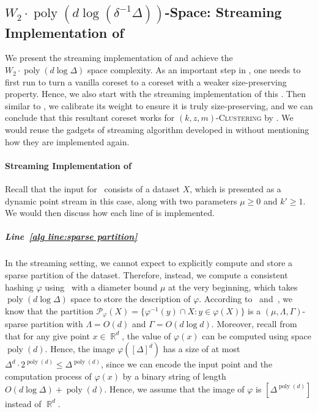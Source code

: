 \documentclass[letterpaper,11pt]{article}
\theoremstyle{plain}
\theoremstyle{definition}
\theoremstyle{remark}
\DeclareMathOperator{\R}{\mathbb{R}}
\DeclareMathOperator{\poly}{poly}
\renewcommand{\phi}{\varphi}
\newcommand{\calP}{\mathcal{P}}
\newcommand{\ProblemName}[1]{\textsc{#1}}
\newcommand{\kzmC}{\ProblemName{$(k,z,m)$-Clustering}\xspace}
\begin{document}
%
      \subsection{$W_2\cdot\poly(d\log(\delta^{-1}\Delta))$-Space: Streaming Implementation of~}
\label{sec:streaming alg}
We present the streaming implementation of  and achieve the $W_2\cdot \poly(d\log\Delta)$ space complexity.
As an important step in , one needs to first run  to turn a vanilla coreset to a coreset with a weaker size-preserving property.
Hence, we also start with the streaming implementation of this .
Then similar to , we calibrate its weight to ensure it is truly size-preserving,
and we can conclude that this resultant coreset works for \kzmC by .
We would reuse the gadgets of streaming algorithm developed in  without mentioning how they are implemented again.




\paragraph{Streaming Implementation of~}
Recall that the input for~ consists of a dataset $X$, which is presented as a dynamic point stream in this case, along with two parameters $\mu\geq 0$ and $k'\geq 1$. 
We would then discuss how each line of  is implemented.

\subparagraph{Line~\ref{alg line:sparse partition}} 

In the streaming setting, we cannot expect to explicitly compute and store a sparse partition of the dataset. Therefore, instead, we compute a consistent hashing $\phi$ using~ with a diameter bound $\mu$ at the very beginning, which takes $\poly(d\log\Delta)$ space to store the description of $\phi$.
According to~ and~, we know that the partition $\calP_\phi(X) = \{\phi^{-1}(y)\cap X: y\in \phi(X)\}$ is a $(\mu,\Lambda,\Gamma)$-sparse partition with $\Lambda = O(d)$ and $\Gamma = O(d\log d)$. 
Moreover, recall from~ that for any give point $x\in \R^d$, the value of $\phi(x)$ can be computed using space $\poly(d)$. 
Hence, the image $\phi([\Delta]^d)$ has a size of at most $\Delta^d \cdot 2^{\poly(d)}\le \Delta^{\poly(d)}$, since we can encode the input point and the computation process of $\phi(x)$ by a binary string of length $O(d\log\Delta) + \poly(d)$. 
Hence, we assume that the image of $\phi$ is $[\Delta^{\poly(d)}]$ instead of $\R^d$.
\end{document}
